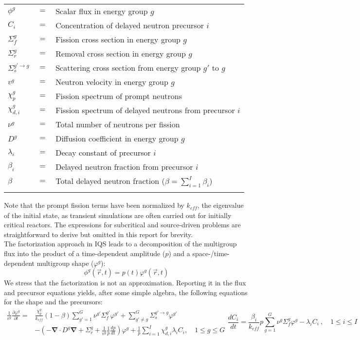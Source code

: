 \documentclass[12pt]{scrartcl}
\renewcommand{\div}{\bs{\nabla}\! \cdot \!}
\newcommand{\grad}{\bs{\nabla}}
\newcommand{\bs}[1]{\mathbf{#1}}
\newcommand{\keff}{k_\textit{eff}}
\newcommand{\be}{\begin{equation}}
\newcommand{\ee}{\end{equation}}
\begin{document}
\begin{tabular}{lll}
$\phi^g$   			&	$=$	&	Scalar flux in energy group $g$ \\
$C_i$					  &	$=$	&	Concentration of delayed neutron precursor $i$ \\
$\Sigma_f^{g}$	&	$=$	&	Fission cross section in energy group $g$ \\
$\Sigma_r^{g}$	&	$=$	&	Removal cross section in energy group $g$ \\
$\Sigma_s^{g' \to g}$	&	$=$	&	Scattering cross section from energy group $g'$ to $g$ \\
$v^g$					  &	$=$	&	Neutron velocity in energy group $g$ \\
$\chi_p^g$			&	$=$	&	Fission spectrum of prompt neutrons \\
$\chi_{d,i}^g$	&	$=$	&	Fission spectrum of delayed neutrons from precursor $i$ \\
$\nu^g$					&	$=$	&	Total number of neutrons per fission \\
$D^g$					  &	$=$	&	Diffusion coefficient in energy group $g$\\
$\lambda_i$			&	$=$	&	Decay constant of precursor $i$ \\
$\beta_i$				&	$=$	&	Delayed neutron fraction  from precursor $i$ \\
$\beta$			 	  &	$=$	&	Total delayed neutron fraction ($\beta = \sum_{i=1}^I \beta_{i}$) \\
  & & 
\end{tabular}

Note that the prompt fission terms have been normalized by $\keff$, the eigenvalue of the initial state, as transient simulations are often carried out for initially critical reactors. The expressions for subcritical and source-driven problems are straightforward to derive but omitted in this report for brevity. \\

The factorization approach in IQS leads to a decomposition of the multigroup flux into the product of a time-dependent amplitude ($p$) and a space-/time-dependent multigroup shape ($\varphi^g$):
\be
\phi^g(\vec{r},t)=p(t)\varphi^g(\vec{r},t)
\ee
We stress that the factorization is not an approximation. Reporting it in the flux and precursor equations yields, after some simple algebra, the following equations for the shape and the precursors:
\begin{subequations}
\begin{align}
\frac{1}{v^g}\frac{\partial\varphi^g}{\partial t} = &\frac{\chi_p^g}{\keff} (1-\beta)\sum_{g'=1}^G  \nu^{g'} \Sigma_f^{g'} \varphi^{g'} + \sum_{g'\neq g}^G\Sigma_s^{g'\to g} \varphi^{g'} \nonumber \\ 
& -  \left( -\div D^g \grad  + \Sigma_r^g + \boxed{\frac{1}{v^g}\frac{1}{p}\frac{dp}{dt}}\right) \varphi^g + \boxed{\frac{1}{p}}\sum_{i=1}^I\chi_{d,i}^g\lambda_iC_i  , \quad 1 \le g \le G 
\label{eq:shape2}
\end{align}
\be
\frac{dC_i}{dt} = \frac{\beta_i}{\keff}\boxed{p} \sum_{g=1}^G\nu^{g} \Sigma_f^g \varphi^{g} - \lambda_i C_i \ , \quad 1 \le i \le I 
\label{eq:preq2}
\ee
\end{subequations}
\end{document}
